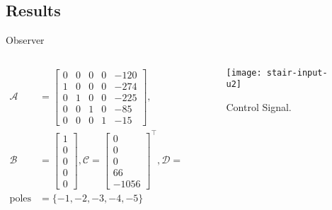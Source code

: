 
\subsection{Results}%
\label{subsec:ts-results}

\begin{slide}{Observer}
  \begin{columns}[c]
    \begin{column}{0.55\textwidth}
      \begin{align}
        \mathcal{A}    & = \begin{bmatrix}
                             0 & 0 & 0 & 0 & -120 \\
                             1 & 0 & 0 & 0 & -274 \\
                             0 & 1 & 0 & 0 & -225 \\
                             0 & 0 & 1 & 0 & -85  \\
                             0 & 0 & 0 & 1 & -15
                           \end{bmatrix},             \\
        \mathcal{B}    & =\begin{bmatrix}
                            1 \\ 0 \\ 0 \\ 0 \\ 0
                          \end{bmatrix},
        \mathcal{C} = \begin{bmatrix}
                        0 \\ 0 \\ 0 \\ 66 \\ -1056
                      \end{bmatrix}^{\top},
        \mathcal{D} = 0                                     \\
        \textrm{poles} & = \{-1, -2, -3, -4, -5\}
      \end{align}
    \end{column}%
    \hfill%
    \begin{column}{0.55\textwidth}
      \begin{figure}[ht!]
        \centering
        \texttt{[image: stair-input-u2]}
        \caption{Control Signal.}%
      \end{figure}
    \end{column}%
  \end{columns}
\end{slide}

